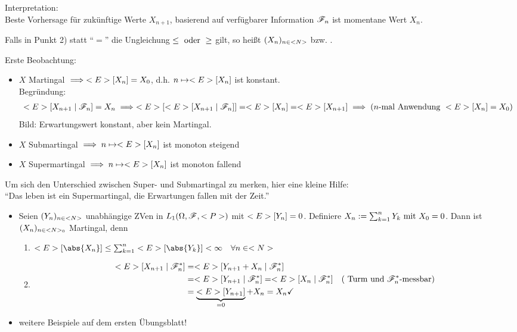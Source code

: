 Interpretation:\\
Beste Vorhersage für zukünftige Werte $X_{n+1}$, basierend auf verfügbarer Information $\F_n$ ist momentane Wert $X_n$.
\begin{*definition}
	Falls in Punkt 2) statt ``$=$'' die Ungleichung $\le \oder \ge$ gilt, so heißt $(X_n)_{n \in \N}$  bzw. .
\end{*definition}
Erste Beobachtung:\\
\begin{itemize}
	\item $X$ Martingal $\implies \E[X_n] = X_0$, d.h. $n \mapsto \E[X_n]$ ist konstant.\\
	Begründung:
	\begin{align*}
		\E[X_{n+1} \mid \F_n] = X_n \implies \E[\E[X_{n+1}\mid \F_n]] = \E[X_n] = \E[X_{n+1}] \implies (n\text{-mal Anwendung } \E[X_n] = X_0)
	\end{align*}
	Bild: Erwartungswert konstant, aber kein Martingal.
	\item $X$ Submartingal $\implies n \mapsto \E[X_n]$ ist monoton steigend
	\item $X$ Supermartingal $\implies n \mapsto \E[X_n]$ ist monoton fallend
\end{itemize}
Um sich den Unterschied zwischen Super- und Submartingal zu merken, hier eine kleine Hilfe:\\
``Das leben ist ein Supermartingal, die Erwartungen fallen mit der Zeit.''
\begin{*example}
	\begin{itemize}
		\item Seien $(Y_n)_{n\in \N}$ unabhängige ZVen in $L_1(\O,\F,\P)$ mit $\E[Y_n] = 0$. Definiere $X_n := \sum_{k=1}^n Y_k \mit X_0 = 0$. Dann ist $(X_n)_{n \in \N_0}$ Martingal, denn
		\begin{enumerate}
			\item $\E[\abs{X_n}] \le \sum_{k=1}^n \E[\abs{Y_k}] < \infty \quad \forall n \in \N$ \checkmark
			\item
			\begin{align*}
				\E[X_{n+1} \mid \F_n^{\ast}] &= \E[Y_{n+1} + X_n \mid \F_n^{\ast}]\\
				&= \E[Y_{n+1} \mid \F_n^{\ast}] = \E[X_n \mid \F_n^{\ast}] \quad (\text{ Turm und $\F_n^{\ast}$-messbar})\\
				&= \underbrace{\E[Y_{n+1}]}_{=0} + X_n = X_n \checkmark
			\end{align*}
		\end{enumerate}
		\item weitere Beispiele auf dem ersten Übungsblatt!
	\end{itemize}
\end{*example}
